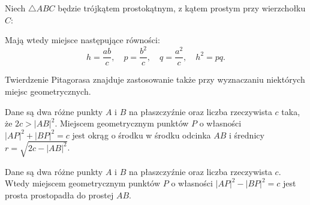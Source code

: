 \begin{proposition}
    Niech $\triangle ABC$ będzie trójkątem prostokątnym, z kątem prostym przy wierzchołku $C$:
    \begin{center}
\begin{comment}
    \begin{tikzpicture}[scale=.4]
        \tkzDefPoint(200:5){A}
        \tkzDefPoint(20:5){B}
        \tkzDefPoint(90:5){C}
        \tkzDefPointsBy[projection=onto A--B](C){D}
        \tkzLabelPoint[below left](200:5){A}
        \tkzLabelPoint[below right](22:5.3){B}
        \tkzLabelPoint[above](90:5.2){C}
        
        \tkzMarkRightAngle[size=0.8](A,C,B)
        \tkzDrawPolygons[line width=0.2mm](A,B,C)
        \tkzDrawSegment[dim={$\,\,p\,\,$,-8pt,transform shape,sloped}](A,D)
        \tkzDrawSegment[dim={$\,\,q\,\,$,-8pt,transform shape,sloped}](D,B)
        \tkzDrawSegment[dim={$\,\,b\,\,$,-8pt,transform shape,sloped}](C,A)
        \tkzDrawSegment[dim={$\,\,a\,\,$,-8pt,transform shape,sloped}](B,C)
        \tkzDrawPoints[size=3,color=black,fill=black!50](A,B,C)
        \tkzDrawSegment[dim={$\,\,h\,\,$,-0pt,transform shape,sloped}](C,D)
\end{tikzpicture}
\end{comment}
    \end{center}
    Mają wtedy miejsce następujące równości:
    \begin{equation}
        h = \frac{ab}{c}, \quad
        p = \frac{b^2}{c}, \quad
        q = \frac{a^2}{c}, \quad
        h^2 = pq.
    \end{equation}
\end{proposition}

Twierdzenie Pitagorasa znajduje zastosowanie także przy wyznaczaniu niektórych miejsc geometrycznych.

\begin{proposition}
    Dane są dwa różne punkty $A$ i $B$ na płaszczyźnie oraz liczba rzeczywista $c$ taka, że $2c > |AB|^2$.
    Miejscem geometrycznym punktów $P$ o własności $|AP|^2 + |BP|^2 = c$ jest okrąg o środku w środku odcinka $AB$ i średnicy $r = \sqrt{2c - |AB|^2}$.
\end{proposition}

\begin{proposition}
    Dane są dwa różne punkty $A$ i $B$ na płaszczyźnie oraz liczba rzeczywista $c$.
    Wtedy miejscem geometrycznym punktów $P$ o własności $|AP|^2 - |BP|^2 = c$ jest prosta prostopadła do prostej $AB$.
\end{proposition}

